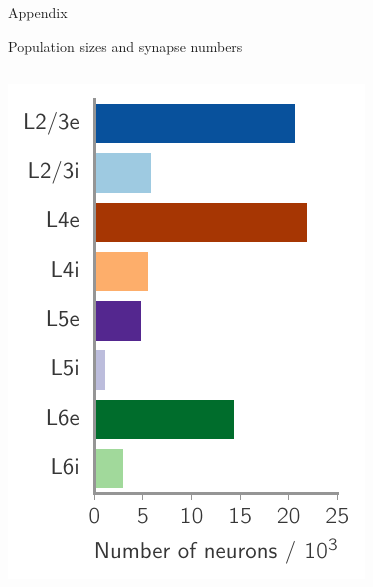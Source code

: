 \documentclass[xcolor=x11names,compress]{beamer}
\renewcommand{\(}{\begin{columns}}
\renewcommand{\)}{\end{columns}}
\newcommand{\<}[1]{\begin{column}{#1}}
\renewcommand{\>}{\end{column}}
\begin{document}
 
\begin{frame}{}
    \huge Appendix
\end{frame}

\begin{frame}[t]{Population sizes and synapse numbers}
    \begin{columns}[T] %
    \begin{column}[T]{5cm} %
        \includegraphics[width=1.0\linewidth]{../figures/population_size}
    \end{column}
    \begin{column}[T]{5cm} %

\end{column}
\end{columns}
\end{frame}
\end{document}
